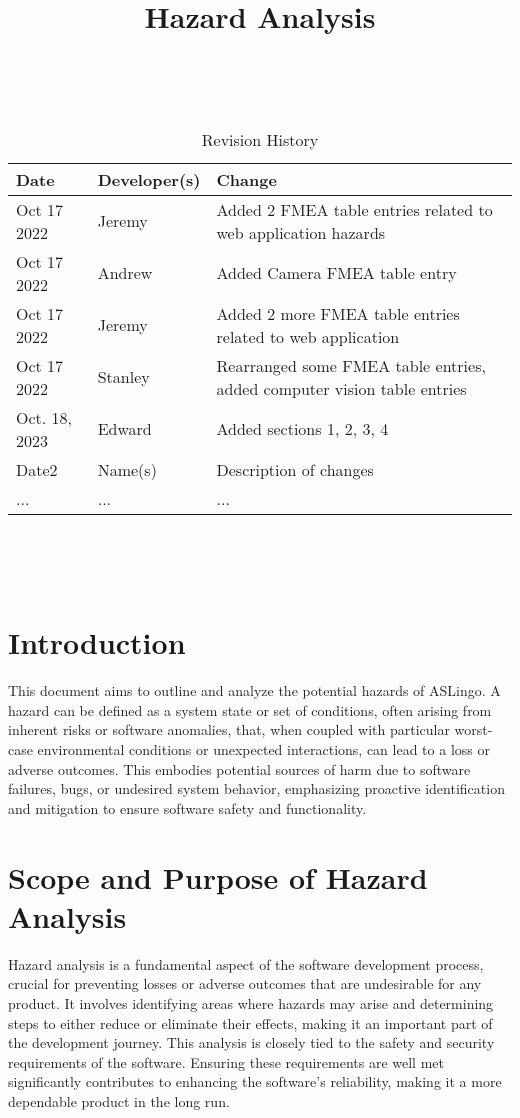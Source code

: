 \documentclass{article}
\title{Hazard Analysis\\\progname}
\author{\authname}
\date{}
\begin{document}
\maketitle
\thispagestyle{empty}

~\newpage


\begin{table}[hp]
\caption{Revision History} \label{TblRevisionHistory}
\begin{tabularx}{\textwidth}{llX}
\toprule
\textbf{Date} & \textbf{Developer(s)} & \textbf{Change}\\
\midrule
Oct 17 2022 & Jeremy & Added 2 FMEA table entries related to web application hazards\\
Oct 17 2022 & Andrew & Added Camera FMEA table entry\\
Oct 17 2022 & Jeremy & Added 2 more FMEA table entries related to web application\\
Oct 17 2022 & Stanley & Rearranged some FMEA table entries, added computer vision table entries\\
Oct. 18, 2023 & Edward & Added sections 1, 2, 3, 4\\
Date2 & Name(s) & Description of changes\\
... & ... & ...\\
\bottomrule
\end{tabularx}
\end{table}

~\newpage

\tableofcontents

~\newpage


\section{Introduction}
This document aims to outline and analyze the potential hazards of ASLingo. A hazard can be defined as a system state or set of conditions, often arising from inherent risks or software anomalies, that, when coupled with particular worst-case environmental conditions or unexpected interactions, can lead to a loss or adverse outcomes. This embodies potential sources of harm due to software failures, bugs, or undesired system behavior, emphasizing proactive identification and mitigation to ensure software safety and functionality.

\section{Scope and Purpose of Hazard Analysis}
Hazard analysis is a fundamental aspect of the software development process, crucial for preventing losses or adverse outcomes that are undesirable for any product. It involves identifying areas where hazards may arise and determining steps to either reduce or eliminate their effects, making it an important part of the development journey. This analysis is closely tied to the safety and security requirements of the software. Ensuring these requirements are well met significantly contributes to enhancing the software's reliability, making it a more dependable product in the long run.
\end{document}
